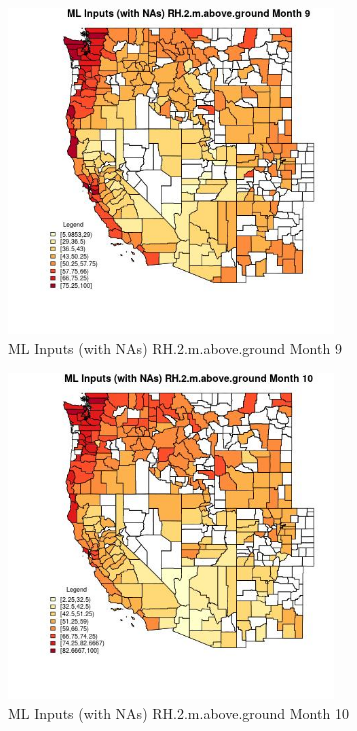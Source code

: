 \begin{figure} 
\centering  
\includegraphics[width=0.77\textwidth]{Code_Outputs/Report_ML_input_PM25_Step4_part_e_de_duplicated_aves_compiled_2019-05-21wNAs_CountyRH2mabovegroundmedianMonth9.jpg} 
\caption{\label{fig:Report_ML_input_PM25_Step4_part_e_de_duplicated_aves_compiled_2019-05-21wNAsCountyRH2mabovegroundmedianMonth9}ML Inputs (with NAs) RH.2.m.above.ground Month 9} 
\end{figure} 
 

\begin{figure} 
\centering  
\includegraphics[width=0.77\textwidth]{Code_Outputs/Report_ML_input_PM25_Step4_part_e_de_duplicated_aves_compiled_2019-05-21wNAs_CountyRH2mabovegroundmedianMonth10.jpg} 
\caption{\label{fig:Report_ML_input_PM25_Step4_part_e_de_duplicated_aves_compiled_2019-05-21wNAsCountyRH2mabovegroundmedianMonth10}ML Inputs (with NAs) RH.2.m.above.ground Month 10} 
\end{figure} 
 

